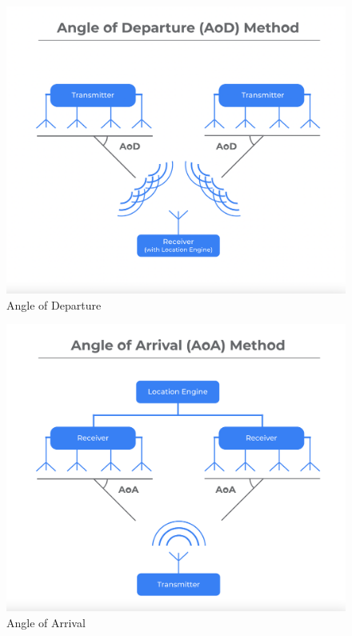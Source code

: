 \begin{figure}
    \includegraphics[width=\linewidth]{angle_of_departure_graphic.png}
    \caption{Angle of Departure}
    \label{fig:aop}
\end{figure}

\begin{figure}
    \includegraphics[width=\linewidth]{angle_of_arrival_graphic.png}
    \caption{Angle of Arrival}
    \label{fig:aoa}
\end{figure}

